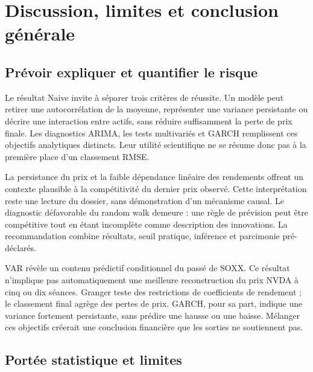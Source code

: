 \section{Discussion, limites et conclusion générale}
\label{sec:conclusion}

\subsection{Prévoir expliquer et quantifier le risque}



Le résultat Naive invite à séparer trois critères de réussite. Un modèle peut retirer une autocorrélation de la moyenne, représenter une variance persistante ou décrire une interaction entre actifs, sans réduire suffisamment la perte de prix finale. Les diagnostics ARIMA, les tests multivariés et GARCH remplissent ces objectifs analytiques distincts. Leur utilité scientifique ne se résume donc pas à la première place d’un classement RMSE.



La persistance du prix et la faible dépendance linéaire des rendements offrent un contexte plausible à la compétitivité du dernier prix observé. Cette interprétation reste une lecture du dossier, sans démonstration d’un mécanisme causal. Le diagnostic défavorable du random walk demeure : une règle de prévision peut être compétitive tout en étant incomplète comme description des innovations. La recommandation combine résultats, seuil pratique, inférence et parcimonie pré-déclarés.



VAR révèle un contenu prédictif conditionnel du passé de SOXX. Ce résultat n’implique pas automatiquement une meilleure reconstruction du prix NVDA à cinq ou dix séances. Granger teste des restrictions de coefficients de rendement ; le classement final agrège des pertes de prix. GARCH, pour sa part, indique une variance fortement persistante, sans prédire une hausse ou une baisse. Mélanger ces objectifs créerait une conclusion financière que les sorties ne soutiennent pas.





\subsection{Portée statistique et limites}



